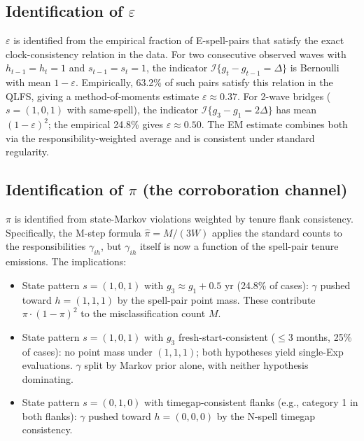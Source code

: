\documentclass[12pt]{article}
\begin{document}
\subsection{Identification of \(\varepsilon\)}

\(\varepsilon\) is identified from the empirical fraction of E-spell-pairs
that satisfy the exact clock-consistency relation in the data. For two
consecutive observed waves with \(h_{t-1}=h_t=1\) and \(s_{t-1}=s_t=1\),
the indicator \(\mathcal{I}\{g_t - g_{t-1} = \Delta\}\) is Bernoulli with
mean \(1-\varepsilon\). Empirically, 63.2\% of such pairs satisfy this
relation in the QLFS, giving a method-of-moments estimate \(\varepsilon \approx 0.37\).
For 2-wave bridges (\(s=(1,0,1)\) with same-spell), the indicator
\(\mathcal{I}\{g_3 - g_1 = 2\Delta\}\) has mean \((1-\varepsilon)^2\); the
empirical 24.8\% gives \(\varepsilon \approx 0.50\). The EM estimate
combines both via the responsibility-weighted average and is consistent
under standard regularity.

\subsection{Identification of \(\pi\) (the corroboration channel)}

\(\pi\) is identified from state-Markov violations weighted by tenure
flank consistency. Specifically, the M-step formula \(\hat\pi = M / (3W)\)
applies the standard counts to the responsibilities \(\gamma_{ih}\), but
\(\gamma_{ih}\) itself is now a function of the spell-pair tenure
emissions. The implications:

\begin{itemize}
\item State pattern \(s=(1,0,1)\) with \(g_3 \approx g_1 + 0.5\) yr
  (24.8\% of cases): \(\gamma\) pushed toward \(h=(1,1,1)\) by the spell-pair
  point mass. These contribute \(\pi \cdot (1-\pi)^2\) to the misclassification
  count \(M\).
\item State pattern \(s=(1,0,1)\) with \(g_3\) fresh-start-consistent
  (\(\le 3\) months, 25\% of cases): no point mass under \((1,1,1)\); both
  hypotheses yield single-Exp evaluations. \(\gamma\) split by Markov prior
  alone, with neither hypothesis dominating.
\item State pattern \(s=(0,1,0)\) with timegap-consistent flanks (e.g.,
  category 1 in both flanks): \(\gamma\) pushed toward \(h=(0,0,0)\) by the
  N-spell timegap consistency.
\end{itemize}
\end{document}
